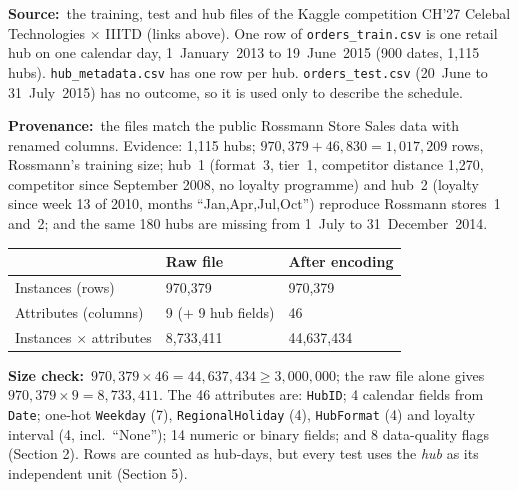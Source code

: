 \documentclass[10pt,a4paper,twocolumn]{article}
\newcommand{\field}[2]{\textbf{#1}~#2\par}
\newcommand{\code}[1]{\texttt{#1}}
\begin{document}
\field{Source:}{the training, test and hub files of the Kaggle competition CH'27 Celebal Technologies $\times$ IIITD
(links above). One row of \code{orders\_train.csv} is one retail hub on one calendar day, 1~January~2013 to
19~June~2015 (900 dates, 1{,}115 hubs). \code{hub\_metadata.csv} has one row per hub. \code{orders\_test.csv}
(20~June to 31~July~2015) has no outcome, so it is used only to describe the schedule.}

\field{Provenance:}{the files match the public Rossmann Store Sales data with renamed columns. Evidence:
1{,}115 hubs; $970{,}379+46{,}830=1{,}017{,}209$ rows, Rossmann's training size; hub~1 (format~3, tier~1,
competitor distance 1{,}270, competitor since September 2008, no loyalty programme) and hub~2 (loyalty since week 13
of 2010, months ``Jan,Apr,Jul,Oct'') reproduce Rossmann stores~1 and~2; and the same 180 hubs are missing from
1~July to 31~December~2014.}

{\small
\begin{tabularx}{\linewidth}{@{}L{3.0cm} Y Y@{}}
\toprule
 & \textbf{Raw file} & \textbf{After encoding} \\
\midrule
Instances (rows) & 970{,}379 & 970{,}379 \\
Attributes (columns) & 9 (+ 9 hub fields) & 46 \\
Instances $\times$ attributes & 8{,}733{,}411 & 44{,}637{,}434 \\
\bottomrule
\end{tabularx}}

\field{Size check:}{$970{,}379\times46=44{,}637{,}434\ge3{,}000{,}000$; the raw file alone gives
$970{,}379\times9=8{,}733{,}411$. The 46 attributes are: \code{HubID}; 4 calendar fields from \code{Date};
one-hot \code{Weekday} (7), \code{RegionalHoliday} (4), \code{HubFormat} (4) and loyalty interval (4, incl.\ ``None'');
14 numeric or binary fields; and 8 data-quality flags (Section 2). Rows are counted as hub-days, but every test uses
the \emph{hub} as its independent unit (Section 5).}
\end{document}
